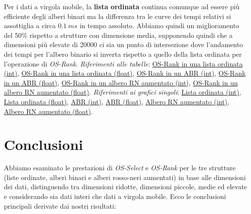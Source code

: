\documentclass[onecolumn]{article}
\begin{document}
Per i dati a virgola mobile, la \textbf{lista ordinata} continua comunque ad essere più efficiente degli alberi binari ma la differenza tra le curve dei tempi relativi si assottiglia a circa \(0.1\:ms\) in tempo assoluto. Abbiamo quindi un miglioramento del 50\% rispetto a strutture con dimensione media, supponendo quindi che a dimensioni più elevate di 20000 ci sia un punto di intersezione dove l'andamento dei tempi per l'albero binario si inverta rispetto a quello della lista ordinata per l'operazione di \textit{OS-Rank}. 
\newline
\newline
\textit{Riferimenti alle tabelle}: \hyperref[label:lista-ordinata-l-os-rank]{OS-Rank in una lista ordinata (int)}, \hyperref[label:lista-ordinata-l-float-os-rank]{OS-Rank in una lista ordinata (float)}, \hyperref[label:abr-l-os-rank]{OS-Rank in un ABR (int)}, \hyperref[label:abr-l-float-os-rank]{OS-Rank in un ABR (float)}, \hyperref[label:rn-aumentato-l-os-rank]{OS-Rank in un albero RN aumentato (int)}, \hyperref[label:rn-aumentato-l-float-os-rank]{OS-Rank in un albero RN aumentato (float)}.
\newline
\newline
\textit{Riferimenti ai grafici singoli}: \hyperref[label:lista-ordinata-l]{Lista ordinata (int)}, \hyperref[label:lista-ordinata-l-float]{Lista ordinata (float)}, \hyperref[label:abr-l]{ABR (int)}, \hyperref[label:abr-l-float]{ABR (float)}, \hyperref[label:rn-aumentato-l]{Albero RN aumentato (int)}, \hyperref[label:rn-aumentato-l-float]{Albero RN aumentato (float)}.

\newpage
\section{Conclusioni}

Abbiamo esaminato le prestazioni di \textit{OS-Select} e \textit{OS-Rank} per le tre strutture (liste ordinate, alberi binari e alberi rosso-neri aumentati) in base alle dimensioni dei dati, distinguendo tra dimensioni ridotte, dimensioni piccole, medie ed elevate e considerando sia dati interi che dati a virgola mobile. Ecco le conclusioni principali derivate dai nostri risultati:
\end{document}
